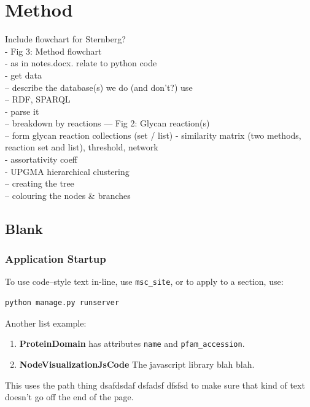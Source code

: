 \documentclass[12pt,a4paper]{article}
\begin{document}
\section{Method}
\label{sec:method}

Include flowchart for Sternberg?\\
- Fig 3: Method flowchart\\
- as in notes.docx. relate to python code\\
- get data\\
-- describe the database(s) we do (and don't?) use\\
-- RDF, SPARQL\\
- parse it\\
-- breakdown by reactions
--- Fig 2: Glycan reaction(s)\\
-- form glycan reaction collections (set / list)
- similarity matrix (two methods, reaction set and list), threshold, network\\
- assortativity coeff\\

- UPGMA hierarchical clustering\\
-- creating the tree\\
-- colouring the nodes \& branches\\


\subsection{Blank}

\subsubsection{Application Startup}
\label{sec:startup}
To use code--style text in-line, use \texttt{msc\_site}, or to apply to a section, use:

\begin{verbatim}
python manage.py runserver
\end{verbatim}

Another list example:

\begin{enumerate}
\item {\bf ProteinDomain} has attributes \texttt{name} and \texttt{pfam\_accession}.
\item {\bf NodeVisualizationJsCode} The javascript library blah blah.
\end{enumerate}


This uses the path thing dsafdsdaf dsfadsf dfsfsd  to make sure that kind of text doesn't go off the end of the page. 
\end{document}
